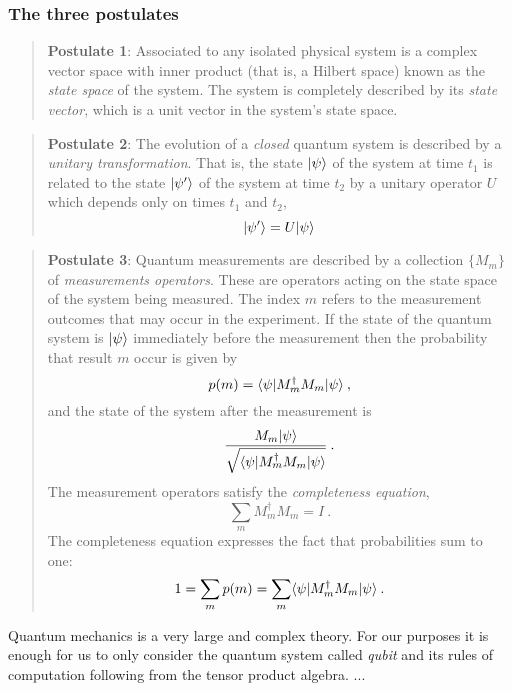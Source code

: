 	\subsubsection*{The three postulates}
	\begin{quote}
		\textbf{Postulate 1}: Associated to any isolated physical system is a complex vector space with inner product (that is, a Hilbert space) known as the \emph{state space} of the system. 
		The system is completely described by its \emph{state vector}, which is a unit vector in the system's state space. \cite{NC10}
	\end{quote}
	
	\begin{quote}
		\textbf{Postulate 2}: The evolution of a \emph{closed} quantum system is described by a \emph{unitary transformation}. That is, the state $|\psi \rangle$ of the system at time $t_1$ is related to the state $|\psi' \rangle$ of the system at time $t_2$ by a unitary operator $U$ which depends only on times $t_1$ and $t_2$,
		$$ |\psi' \rangle = U|\psi \rangle $$
		\cite{NC10}
	\end{quote}
	
	\begin{quote}
		\textbf{Postulate 3}: Quantum measurements are described by a collection $\{M_m\}$ of \emph{measurements operators}. 
		These are operators acting on the state space of the system being measured. 
		The index $m$ refers to the measurement outcomes that may occur in the experiment. If the state of the quantum system is $|\psi \rangle$ immediately before the measurement then the probability that result $m$ occur is given by 
		$$ p(m) = \langle \psi|M_m^{\dagger}M_m|\psi \rangle \: ,$$
		and the state of the system after the measurement is 
		$$ \frac{M_m|\psi \rangle}{\sqrt{\langle \psi|M_m^{\dagger}M_m|\psi \rangle}} \: . $$
		The measurement operators satisfy the \emph{completeness equation},
		$$\sum_m  M_m^{\dagger}M_m = I \: .$$
		The completeness equation expresses the fact that probabilities sum to one:
		$$ 1 = \sum_m p(m) = \sum_m  \langle \psi|M_m^{\dagger}M_m|\psi \rangle \: .$$ 
		\cite{NC10}
	\end{quote}
	
	Quantum mechanics is a very large and complex theory. For our purposes it is enough for us to only consider the quantum system called \emph{qubit} and its rules of computation following from the tensor product algebra.  ...
	
